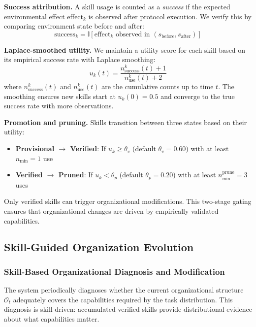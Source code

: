 \textbf{Success attribution.} A skill usage is counted as a \emph{success} if the expected environmental effect $\text{effect}_k$ is observed after protocol execution. We verify this by comparing environment state before and after:
\begin{equation}
    \text{success}_k = \mathbb{I}[\text{effect}_k \text{ observed in } (s_{\text{before}}, s_{\text{after}})]
\end{equation}

\textbf{Laplace-smoothed utility.} We maintain a utility score for each skill based on its empirical success rate with Laplace smoothing:
\begin{equation}
    u_k(t) = \frac{n_{\text{success}}^k(t) + 1}{n_{\text{use}}^k(t) + 2}
\end{equation}
where $n_{\text{success}}^k(t)$ and $n_{\text{use}}^k(t)$ are the cumulative counts up to time $t$. The smoothing ensures new skills start at $u_k(0) = 0.5$ and converge to the true success rate with more observations.

\textbf{Promotion and pruning.} Skills transition between three states based on their utility:
\begin{itemize}
    \item \textbf{Provisional $\rightarrow$ Verified}: If $u_k \geq \theta_v$ (default $\theta_v = 0.60$) with at least $n_{\min} = 1$ use
    \item \textbf{Verified $\rightarrow$ Pruned}: If $u_k < \theta_p$ (default $\theta_p = 0.20$) with at least $n_{\min}^{\text{prune}} = 3$ uses
\end{itemize}
Only verified skills can trigger organizational modifications. This two-stage gating ensures that organizational changes are driven by empirically validated capabilities.


\subsection{Skill-Guided Organization Evolution}

\subsubsection{Skill-Based Organizational Diagnosis and Modification}

The system periodically diagnoses whether the current organizational structure $\mathcal{O}_t$ adequately covers the capabilities required by the task distribution. This diagnosis is skill-driven: accumulated verified skills provide distributional evidence about what capabilities matter.

